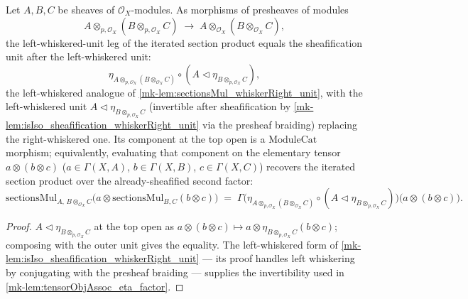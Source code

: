 \begin{lemma}\label{mk-lem:sectionsMul_whiskerLeft_unit}
  \leanok

  Let \(A, B, C\) be sheaves of \(\mathcal{O}_X\)-modules. As morphisms of
  presheaves of modules
  \[
    A \otimes_{p,\mathcal{O}_X} (B \otimes_{p,\mathcal{O}_X} C)
      \;\longrightarrow\;
    A \otimes_{\mathcal{O}_X} (B \otimes_{\mathcal{O}_X} C),
  \]
  the left-whiskered-unit leg of the iterated section product equals the
  sheafification unit after the left-whiskered unit:
  \[
    \eta_{A \otimes_{p,\mathcal{O}_X} (B \otimes_{\mathcal{O}_X} C)}
      \circ (A \lhd \eta_{B \otimes_{p,\mathcal{O}_X} C}),
  \]
  the left-whiskered analogue of \ref{mk-lem:sectionsMul_whiskerRight_unit}, with the
  left-whiskered unit \(A \lhd \eta_{B \otimes_{p,\mathcal{O}_X} C}\) (invertible
  after sheafification by \ref{mk-lem:isIso_sheafification_whiskerRight_unit} via the
  presheaf braiding) replacing the right-whiskered one. Its component at the
  top open is a \(\mathrm{ModuleCat}\) morphism; equivalently, evaluating that
  component on the elementary tensor \(a \otimes (b \otimes c)\)
  (\(a \in \Gamma(X,A)\), \(b \in \Gamma(X,B)\), \(c \in \Gamma(X,C)\)) recovers the
  iterated section product over the already-sheafified second factor:
  \[
    \mathrm{sectionsMul}_{A,\, B \otimes_{\mathcal{O}_X} C}\bigl(
      a \otimes \mathrm{sectionsMul}_{B,C}(b \otimes c)\bigr)
    \;=\;
    \Gamma\bigl(
      \eta_{A \otimes_{p,\mathcal{O}_X} (B \otimes_{\mathcal{O}_X} C)}
        \circ (A \lhd \eta_{B \otimes_{p,\mathcal{O}_X} C})
    \bigr)\bigl(a \otimes (b \otimes c)\bigr).
  \]
\end{lemma}

\begin{proof}
  \leanok
  \(A \lhd \eta_{B \otimes_{p,\mathcal{O}_X} C}\) at the top open as
  \(a \otimes (b \otimes c) \mapsto a \otimes \eta_{B \otimes_{p,\mathcal{O}_X} C}(b \otimes c)\);
  composing with the outer unit gives the equality. The left-whiskered form of
  \ref{mk-lem:isIso_sheafification_whiskerRight_unit} --- its proof handles left
  whiskering by conjugating with the presheaf braiding --- supplies the
  invertibility used in \ref{mk-lem:tensorObjAssoc_eta_factor}.
\end{proof}

